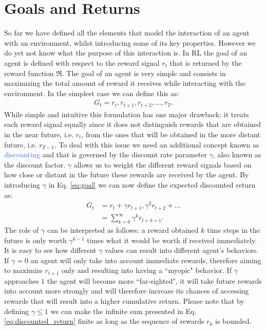 \section{Goals and Returns}
So far we have defined all the elements that model the interaction of an agent with an environment, whilst introducing some of its key properties. However we do yet not know what the purpose of this interaction is. In RL the goal of an agent is defined with respect to the reward signal $r_t$ that is returned by the reward function $\Re$. The goal of an agent is very simple and consists in maximizing the total amount of reward it receives while interacting with the environment. In the simplest case we can define this as:
\begin{align}
	G_t = r_t, r_{t+1}, r_{t+2}, \ldots, r_{T}.
\label{eq:goal}
\end{align}
While simple and intuitive this formulation has one major drawback: it treats each reward signal equally since it does not distinguish rewards that are obtained in the near future, i.e. $r_t$, from the ones that will be obtained in the more distant future, i.e. $r_{T-1}$. To deal with this issue we need an additional concept known as \textcolor{RoyalBlue}{discounting} and that is governed by the discount rate parameter $\gamma$, also known as the discount factor. $\gamma$ allows us to weight the different reward signals based on how close or distant in the future these rewards are received by the agent. By introducing $\gamma$ in Eq. \ref{eq:goal} we can now define the expected discounted return as:
\begin{align}
	G_t & = r_t+\gamma r_{t+1}, \gamma^{2} r_{t+2} + ... \\
	    & = \sum_{k=0}^{\infty}\gamma^{k} r_{t+k+1}.
\label{eq:discounted_return}
\end{align}
The role of $\gamma$ can be interpreted as follows: a reward obtained $k$ time steps in the future is only worth $\gamma^{k-1}$ times what it would be worth if received immediately. It is easy to see how different $\gamma$ values can result into different agent's behaviors. If $\gamma=0$ an agent will only take into account immediate rewards, therefore aiming to maximize $r_{t+1}$ only and resulting into having a ``myopic" behavior. If $\gamma$ approaches $1$ the agent will become more ``far-sighted", it will take future rewards into account more strongly and will therefore increase its chances of accessing rewards that will result into a higher cumulative return. 
Please note that by defining $\gamma \leq 1$ we can make the infinite sum presented in Eq. \ref{eq:discounted_return} finite as long as the sequence of rewards $r_k$ is bounded.   

